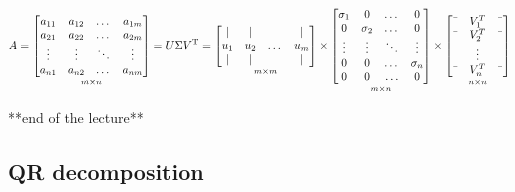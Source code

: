 \[
    A = 
    \underset{m \times n}{
        \begin{bmatrix}
            a_{11} & a_{12} & \dots & a_{1m} \\
            a_{21} & a_{22} & \dots & a_{2m} \\
            \vdots & \vdots & \ddots & \vdots \\
            a_{n1} & a_{n2} & \dots & a_{nm}
        \end{bmatrix}
    }
    = U\Sigma V^\text{T} = 
    \underset{m \times m}{
        \begin{bmatrix}
            | & | & \ & | \\
            u_{1} & u_{2} & \dots & u_{m} \\
            | & | & \ & |
        \end{bmatrix}
    }
    \times
    \underset{m \times n}{
    \begin{bmatrix}
    \sigma_{1} & 0 & \dots & 0 \\
    0 & \sigma_{2} & \dots & 0 \\
    \vdots & \vdots & \ddots & \vdots \\
    0 & 0 & \dots & \sigma_{n} \\
    0 & 0 & \ldots & 0 \\
    \end{bmatrix}}
    \times
    \underset{n \times n}{
        \begin{bmatrix}
            \textemdash & V_{1}^T & \textemdash  \\
            \textemdash & V_{2}^T & \textemdash \\
            \ & \vdots &  \ \\
            \textemdash & V_{n}^T & \textemdash \\
        \end{bmatrix}
    }    
\]

**end of the lecture**
\subsection*{QR decomposition}